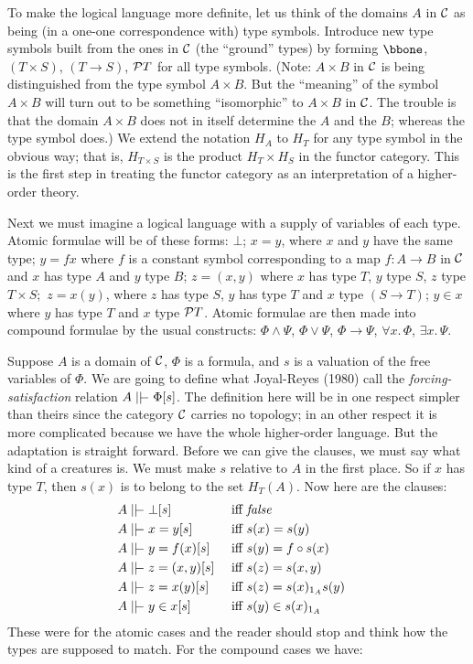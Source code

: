 To make the logical language more definite, let us think of the domains $A$ in $\C$ as
being (in a one-one correspondence with) type symbols. Introduce new type symbols built
from the ones in $\C$ (the ``ground'' types) by forming $\bbone$, $(T \times S)$, $(T\to
S)$, $\P T$ for all type symbols. (Note: $A \times B$ in $\C$ is being distinguished from
the type symbol $A \times B$. But the ``meaning'' of the symbol $A\times B$ will turn out
to be something ``isomorphic'' to $A\times B$ in $\C$. The trouble is that the domain $A
\times B$ does not in itself determine the $A$ and the $B$; whereas the type symbol does.)
We extend the notation $H_A$ to $H_T$ for any type symbol in the obvious way; that is,
$H_{T \times S}$ is the product $H_T \times H_S$ in the functor category. This is the
first step in treating the functor category as an interpretation of a higher-order theory.

Next we must imagine a logical language with a supply of variables of each type. Atomic
formulae will be of these forms: $\bot$; $x = y$, where $x$ and $y$ have the same type; $y
= f x$ where $f$ is a constant symbol corresponding to a map $f: A \to B$ in $\C$ and $x$
has type $A$ and $y$ type $B$; $z = (x,y)$ where $x$ has type $T$, $y$ type $S$, $z$ type
$T \times S;$ $z = x(y)$, where $z$ has type $S$, $y$ has type $T$ and $x$ type $(S \to
T)$; $y \in x$ where $y$ has type $T$ and $x$ type $\P T$. Atomic formulae are then made
into compound formulae by the usual constructs: $\Phi \land \Psi$, $\Phi \lor \Psi$, $\Phi
\to \Psi$, $\forall x. \, \Phi$, $\exists x. \, \Psi$.


Suppose $A$ is a domain of $\C$, $\Phi$ is a formula, and $s$ is a valuation of the free
variables of $\Phi$. We are going to define what Joyal-Reyes (1980) call the {\it
forcing-satisfaction} relation $A \mm \Phi[s]$. The definition here will be in one respect
simpler than theirs since the category $\C$ carries no topology; in an other respect it is
more complicated because we have the whole higher-order language. But the adaptation is
straight forward. Before we can give the clauses, we must say what kind of a creatures is.
We must make $s$ relative to $A$ in the first place. So if $x$ has type $T$, then $s(x)$
is to belong to the set $H_T(A)$. Now here are the clauses:
\begin{align*}
  A & \mm \bot [s] & {\textrm{ iff }} & {\mathit { false }} &\\
  A & \mm x = y  [s] & {\textrm{ iff }} & s(x) = s(y) &\\
  A & \mm y = f(x) [s] & {\textrm{ iff }} & s(y) = f \comp s(x) &\\
  A & \mm z = (x,y) [s] & {\textrm{ iff }} & s(z) = s(x,y) &\\
  A & \mm z = x(y) [s] & {\textrm{ iff }} & s(z) = s(x)_{\id_A} s(y) &\\
  A & \mm y \in x [s] & {\textrm{ iff }} & s(y) \in s(x)_{\id_A} &
\end{align*}
These were for the atomic cases and the reader should stop and think how the types are
supposed to match. For the compound cases we have:

